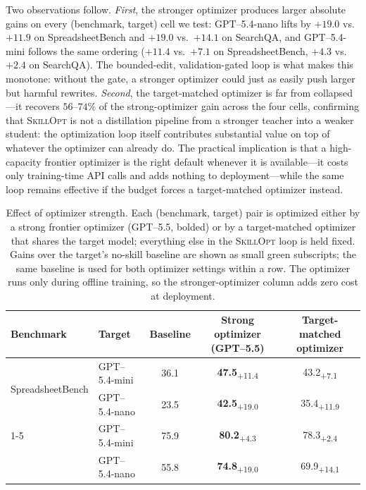 \documentclass[
]{article}
\providecommand{\mrowcell}{}
\newcommand{\ourmethod}{\textsc{SkillOpt}\xspace}
\newcommand{\dvalp}[2]{\hphantom{\textsubscript{+#2}}#1\textsubscript{\textcolor{deltapos}{+#2}}}
\begin{document}
Two observations follow. \emph{First}, the stronger optimizer produces
larger absolute gains on every (benchmark, target) cell we test:
GPT--5.4-nano lifts by \(+19.0\) vs.~\(+11.9\) on SpreadsheetBench and
\(+19.0\) vs.~\(+14.1\) on SearchQA, and GPT--5.4-mini follows the same
ordering (\(+11.4\) vs.~\(+7.1\) on SpreadsheetBench, \(+4.3\)
vs.~\(+2.4\) on SearchQA). The bounded-edit, validation-gated loop is
what makes this monotone: without the gate, a stronger optimizer could
just as easily push larger but harmful rewrites. \emph{Second}, the
target-matched optimizer is far from collapsed---it recovers
\(56\)--\(74\%\) of the strong-optimizer gain across the four cells,
confirming that \ourmethod{} is not a distillation pipeline from a
stronger teacher into a weaker student: the optimization loop itself
contributes substantial value on top of whatever the optimizer can
already do. The practical implication is that a high-capacity frontier
optimizer is the right default whenever it is available---it costs only
training-time API calls and adds nothing to deployment---while the same
loop remains effective if the budget forces a target-matched optimizer
instead.

\begin{table}[t]
\centering
\footnotesize
\setlength{\tabcolsep}{4pt}
\renewcommand{\arraystretch}{0.95}
\begin{tabular}{l l c c c}
\toprule
\textbf{Benchmark} & \textbf{Target} & \textbf{Baseline} & \textbf{Strong optimizer (GPT--5.5)} & \textbf{Target-matched optimizer} \\
\midrule
\multirow{2}{*}{SpreadsheetBench} & GPT--5.4-mini & 36.1 & \dvalp{\textbf{47.5}}{11.4} & \dvalp{43.2}{7.1}  \\
\mrowcell & GPT--5.4-nano & 23.5 & \dvalp{\textbf{42.5}}{19.0} & \dvalp{35.4}{11.9} \\
\cmidrule(lr){1-5}
\multirow{2}{*}{SearchQA}         & GPT--5.4-mini & 75.9 & \dvalp{\textbf{80.2}}{4.3}  & \dvalp{78.3}{2.4}  \\
\mrowcell & GPT--5.4-nano & 55.8 & \dvalp{\textbf{74.8}}{19.0} & \dvalp{69.9}{14.1} \\
\bottomrule
\end{tabular}
\caption{Effect of optimizer strength. Each (benchmark, target) pair is optimized either by a strong frontier optimizer (GPT--5.5, bolded) or by a target-matched optimizer that shares the target model; everything else in the \ourmethod{} loop is held fixed. Gains over the target's no-skill baseline are shown as small green subscripts; the same baseline is used for both optimizer settings within a row. The optimizer runs only during offline training, so the stronger-optimizer column adds zero cost at deployment.}
\label{tab-teacher-model-ablation}
\end{table}
\end{document}
